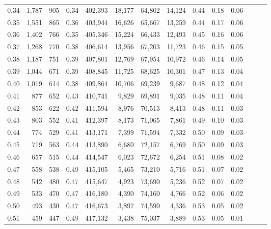 \begin{tabular}{rrrrrrrrrrrrrr}
0.34 &   1,787 &    905 &  0.34 &  402,393 &   18,177 &  64,802 &  14,124 &  0.44 &  0.18 &      0.06 \\
0.35 &   1,551 &    865 &  0.36 &  403,944 &   16,626 &  65,667 &  13,259 &  0.44 &  0.17 &      0.06 \\
0.36 &   1,402 &    766 &  0.35 &  405,346 &   15,224 &  66,433 &  12,493 &  0.45 &  0.16 &      0.06 \\
0.37 &   1,268 &    770 &  0.38 &  406,614 &   13,956 &  67,203 &  11,723 &  0.46 &  0.15 &      0.05 \\
0.38 &   1,187 &    751 &  0.39 &  407,801 &   12,769 &  67,954 &  10,972 &  0.46 &  0.14 &      0.05 \\
0.39 &   1,044 &    671 &  0.39 &  408,845 &   11,725 &  68,625 &  10,301 &  0.47 &  0.13 &      0.04 \\
0.40 &   1,019 &    614 &  0.38 &  409,864 &   10,706 &  69,239 &   9,687 &  0.48 &  0.12 &      0.04 \\
0.41 &     877 &    652 &  0.43 &  410,741 &    9,829 &  69,891 &   9,035 &  0.48 &  0.11 &      0.04 \\
0.42 &     853 &    622 &  0.42 &  411,594 &    8,976 &  70,513 &   8,413 &  0.48 &  0.11 &      0.03 \\
0.43 &     803 &    552 &  0.41 &  412,397 &    8,173 &  71,065 &   7,861 &  0.49 &  0.10 &      0.03 \\
0.44 &     774 &    529 &  0.41 &  413,171 &    7,399 &  71,594 &   7,332 &  0.50 &  0.09 &      0.03 \\
0.45 &     719 &    563 &  0.44 &  413,890 &    6,680 &  72,157 &   6,769 &  0.50 &  0.09 &      0.03 \\
0.46 &     657 &    515 &  0.44 &  414,547 &    6,023 &  72,672 &   6,254 &  0.51 &  0.08 &      0.02 \\
0.47 &     558 &    538 &  0.49 &  415,105 &    5,465 &  73,210 &   5,716 &  0.51 &  0.07 &      0.02 \\
0.48 &     542 &    480 &  0.47 &  415,647 &    4,923 &  73,690 &   5,236 &  0.52 &  0.07 &      0.02 \\
0.49 &     533 &    470 &  0.47 &  416,180 &    4,390 &  74,160 &   4,766 &  0.52 &  0.06 &      0.02 \\
0.50 &     493 &    430 &  0.47 &  416,673 &    3,897 &  74,590 &   4,336 &  0.53 &  0.05 &      0.02 \\
0.51 &     459 &    447 &  0.49 &  417,132 &    3,438 &  75,037 &   3,889 &  0.53 &  0.05 &      0.01 \\

\end{tabular}
